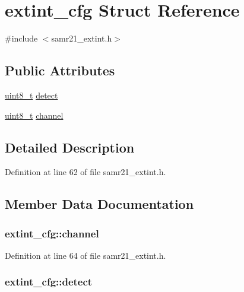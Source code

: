 \hypertarget{structextint__cfg}{}\section{extint\+\_\+cfg Struct Reference}
\label{structextint__cfg}


{\ttfamily \#include $<$samr21\+\_\+extint.\+h$>$}

\subsection*{Public Attributes}
\begin{DoxyCompactItemize}
\item 
\hyperlink{_p_e___types_8h_aba7bc1797add20fe3efdf37ced1182c5}{uint8\+\_\+t} \hyperlink{structextint__cfg_acc6fbb89ae14ab14c0e5461dc149ae66}{detect}
\item 
\hyperlink{_p_e___types_8h_aba7bc1797add20fe3efdf37ced1182c5}{uint8\+\_\+t} \hyperlink{structextint__cfg_a2832bd837b5b565e663b38399b10126b}{channel}
\end{DoxyCompactItemize}


\subsection{Detailed Description}


Definition at line 62 of file samr21\+\_\+extint.\+h.



\subsection{Member Data Documentation}
\subsubsection[{\texorpdfstring{channel}{channel}}]{ extint\+\_\+cfg\+::channel}\hypertarget{structextint__cfg_a2832bd837b5b565e663b38399b10126b}{}\label{structextint__cfg_a2832bd837b5b565e663b38399b10126b}


Definition at line 64 of file samr21\+\_\+extint.\+h.

\subsubsection[{\texorpdfstring{detect}{detect}}]{ extint\+\_\+cfg\+::detect}\hypertarget{structextint__cfg_acc6fbb89ae14ab14c0e5461dc149ae66}{}\label{structextint__cfg_acc6fbb89ae14ab14c0e5461dc149ae66}


